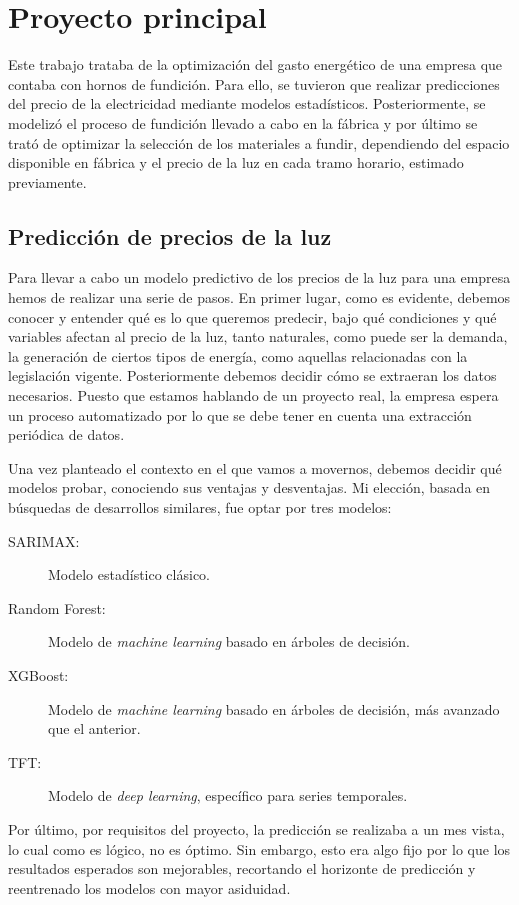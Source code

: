 \section{Proyecto principal}
%
%
Este trabajo trataba de la optimización del gasto energético de una empresa que contaba con hornos de fundición. Para ello, se tuvieron que realizar predicciones del precio de la electricidad mediante modelos estadísticos. Posteriormente, se modelizó el proceso de fundición llevado a cabo en la fábrica y por último se trató de optimizar la selección de los materiales a fundir, dependiendo del espacio disponible en fábrica y el precio de la luz en cada tramo horario, estimado previamente.
%
%
\subsection{Predicción de precios de la luz}
%
%
%
%
Para llevar a cabo un modelo predictivo de los precios de la luz para una empresa hemos de realizar una serie de pasos. En primer lugar, como es evidente, debemos conocer y entender qué es lo que queremos predecir, bajo qué condiciones y qué variables afectan al precio de la luz, tanto naturales, como puede ser la demanda, la generación de ciertos tipos de energía, como aquellas relacionadas con la legislación vigente. Posteriormente debemos decidir cómo se extraeran los datos necesarios. Puesto que estamos hablando de un proyecto real, la empresa espera un proceso automatizado por lo que se debe tener en cuenta una extracción periódica de datos.

Una vez planteado el contexto en el que vamos a movernos, debemos decidir qué modelos probar, conociendo sus ventajas y desventajas. Mi elección, basada en búsquedas de desarrollos similares, fue optar por tres modelos:
\begin{description}
    \item[SARIMAX:] Modelo estadístico clásico.
    \item[Random Forest:] Modelo de \textit{machine learning} basado en árboles de decisión.
    \item[XGBoost:] Modelo de \textit{machine learning} basado en árboles de decisión, más avanzado que el anterior.
    \item[TFT:] Modelo de \textit{deep learning}, específico para series temporales.
\end{description}

Por último, por requisitos del proyecto, la predicción se realizaba a un mes vista, lo cual como es lógico, no es óptimo. Sin embargo, esto era algo fijo por lo que los resultados esperados son mejorables, recortando el horizonte de predicción y reentrenado los modelos con mayor asiduidad.
%
%
%
